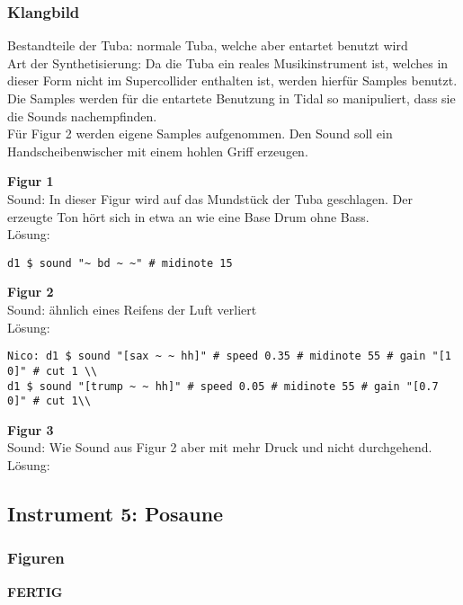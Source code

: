 \documentclass[
10pt, %
a4paper, %
oneside, %
headinclude,footinclude, %
BCOR5mm, %
]{scrartcl}
\begin{document}
\subsubsection{Klangbild}
Bestandteile der Tuba: normale Tuba, welche aber entartet benutzt wird\\
Art der Synthetisierung: Da die Tuba ein reales Musikinstrument ist, welches in dieser Form nicht im Supercollider enthalten ist,
werden hierfür Samples benutzt. Die Samples werden für die entartete Benutzung in Tidal so manipuliert, dass sie die Sounds
nachempfinden.\\
Für Figur 2 werden eigene Samples aufgenommen. Den Sound soll ein Handscheibenwischer mit einem hohlen Griff erzeugen.

\noindent\textbf{Figur 1}\\
 Sound: In dieser Figur wird auf das Mundstück der Tuba geschlagen. Der erzeugte Ton hört sich in etwa an wie eine Base Drum ohne Bass.\\
Lösung:\\
\begin{lstlisting}
d1 $ sound "~ bd ~ ~" # midinote 15
\end{lstlisting}

\noindent\textbf{Figur 2}\\
Sound: ähnlich eines Reifens der Luft verliert\\
Lösung:\\
\begin{lstlisting}
Nico: d1 $ sound "[sax ~ ~ hh]" # speed 0.35 # midinote 55 # gain "[1 0]" # cut 1 \\
d1 $ sound "[trump ~ ~ hh]" # speed 0.05 # midinote 55 # gain "[0.7 0]" # cut 1\\
\end{lstlisting}

\noindent\textbf{Figur 3}\\
Sound: Wie Sound aus Figur 2 aber mit mehr Druck und nicht durchgehend.\\
Lösung:\\


\subsection{Instrument 5: Posaune}
\subsubsection{Figuren}
{\color{green}\textbf{FERTIG}} \\
\end{document}
